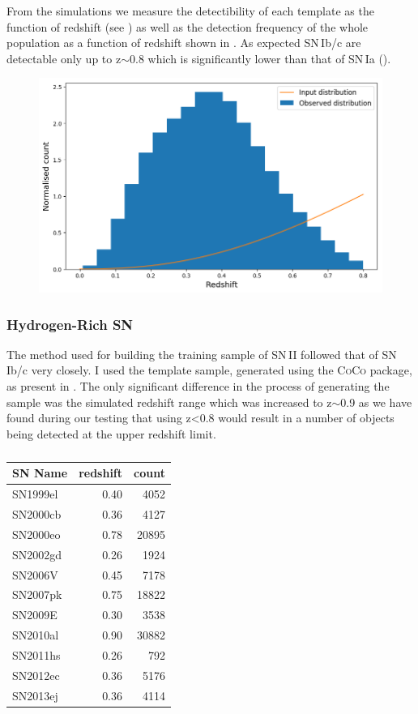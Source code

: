 From the simulations we measure the detectibility of each template as the function of redshift (see ) as well as the detection frequency of the whole population as a function of redshift shown in . As expected SN\,Ib/c are detectable only up to z$\sim$0.8 which is significantly lower than that of SN\,Ia ().

\begin{figure}
  \includegraphics{Figures/Chapter5/SNIbc_z_dist.png}
  \caption{}
  \label{fig:IbcDist}
\end{figure}

\subsubsection{Hydrogen-Rich SN}
The method used for building the training sample of SN\,II followed that of SN\,Ib/c very closely. I used the template sample, generated using the \textsc{CoCo} package, as present in . The only significant difference in the process of generating the sample was the simulated redshift range which was increased to z$\sim$0.9 as we have found during our testing that using z<0.8 would result in a number of objects being detected at the upper redshift limit.

\begin{table}
  \caption{}
  \label{tab:SNIITemplates}
  \centering
  \begin{tabular}{l|r|r}
    SN Name  & redshift & count \\
    \hline
    SN1999el & 0.40 &  4052 \\
    SN2000cb & 0.36 &  4127 \\
    SN2000eo & 0.78 & 20895 \\
    SN2002gd & 0.26 &  1924 \\
    SN2006V  & 0.45 &  7178 \\
    SN2007pk & 0.75 & 18822 \\
    SN2009E  & 0.30 &  3538 \\
    SN2010al & 0.90 & 30882 \\
    SN2011hs & 0.26 &   792 \\
    SN2012ec & 0.36 &  5176 \\
    SN2013ej & 0.36 &  4114 \\
    \hline
  \end{tabular}
\end{table}

